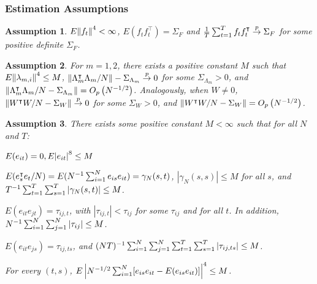 \documentclass[12pt]{article}
\newtheorem{assump}{Assumption}
\newcommand*{\tran}{\intercal}
\theoremstyle{plain}
\numberwithin{equation}{section}
\begin{document}
\subsubsection{Estimation Assumptions}
\begin{assump}
\label{ass:1_factors}
$E\norm{f_t}^4 < \infty$, $E(f_t f_t^\tran) = \Sigma_F$ and $\fracT \sumT f_t f_t^\tran \convp \Sigma_F$ for some positive definite $\Sigma_F$.
\end{assump}
\begin{assump}
\label{ass:2_loadings}
For $m = 1, 2$, 
there exists a positive constant $M$ such that
$E \norm{\lambda_{m, i}}^4 \leq M$, $\norm{ \Lambda_m^{ \tran} \Lambda_m/N} - \Sigma_{{\Lambda_m}} \convp 0$ for some $\Sigma_{\Lambda_m} > 0$, and $\norm{\Lambda_{m}^\tran \Lambda_m / N - \Sigma_{\Lambda_m}} = O_p\left( N^{-1/2}\right) $. Analogously, when $W \neq 0$, $\norm{ W^{ \tran} W/N - \Sigma_{{W}} } \convp 0$ for some $\Sigma_{W} > 0$, and $\norm{W^\tran W / N - \Sigma_{W}} = O_p\left(N^{-1/2}\right) $.
\end{assump}
\begin{assump}
\label{ass:3_errors}
There exists some positive constant $M \lt \infty$ such that for all $N$ and $T$:
\begin{assumpenum}
\item \label{ass:3_errors:1} 
$E(e_{it}) = 0, E\abs{e_{it}}^8 \leq M$
\item 
$E(e_s^\tran e_t /N) = E(N^{-1} \sumN e_{is}e_{it}) = \gamma_{N}(s, t)$, $\left| \gamma_{N}(s, s) \right| \leq M $ for all $s$, and \\
$T^{-1}\sum_{t = 1}^{T} \sum_{s = 1}^{T} \left| \gamma_{N}(s, t) \right| \leq M$.
\item \label{ass:3_errors:2} 
$E(e_{it}e_{jt}) = \tau_{ij, t}$, with $\left| \tau_{ij, t} \right| \lt \tau_{ij}$ for some $\tau_{ij}$ and for all $t$. In addition, \\
$N^{-1} \sum_{i = 1}^{N} \sum_{j = 1}^{N} \left| \tau_{ij}\right| \leq M$.
\item \label{ass:3_errors:3} 
$E(e_{it}e_{js}) = \tau_{ij, ts}$, and $(NT)^{-1} \sum_{i = 1}^{N} \sum_{j = 1}^{N} \sum_{t = 1}^{T} \sum_{s = 1}^{T} \left| \tau_{ij, ts} \right| \leq M$.
\item \label{ass:3_errors:4} 
For every $(t, s)$, $E\left| N^{-1/2} \sum_{i = 1}^{N} [e_{is}e_{it} - E(e_{is}e_{it})]\right|^4 \leq M$.
\end{assumpenum}
\end{assump}
\end{document}
